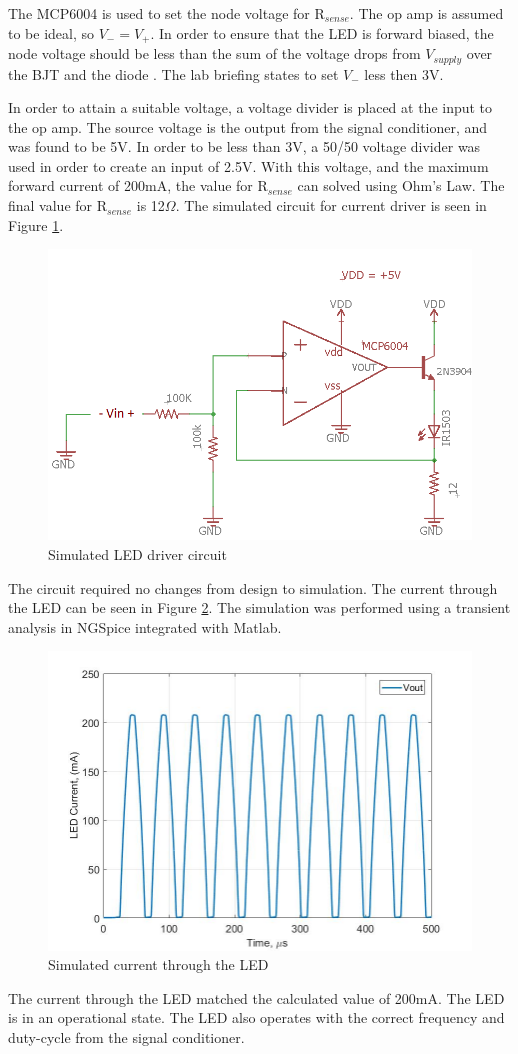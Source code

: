 The MCP6004 is used to set the node voltage for R$_{sense}$. The op amp is assumed to be ideal, so $V_- = V_+$. In order to ensure that the LED is forward biased, the node voltage should be less than the sum of the voltage drops from $V_{supply}$ over the BJT and the diode \cite{b2}. The lab briefing \cite{b2} states to set $V_-$ less then 3V.

In order to attain a suitable voltage, a voltage divider is placed at the input to the op amp. The source voltage is the output from the signal conditioner, and was found to be 5V. In order to be less than 3V, a 50/50 voltage divider was used in order to create an input of 2.5V. With this voltage, and the maximum forward current of 200mA, the value for R$_{sense}$ can solved using Ohm's Law. The final value for R$_{sense}$ is 12$\Omega$. The simulated circuit for current driver is seen in Figure \ref{fig:finalleddriverschem}.

\begin{figure}[H]
	\centering
	\includegraphics[width=0.5\linewidth]{CircuitDevelopment/FinalLEDdriverSChem}
	\caption[Simulated LED driver]{Simulated LED driver circuit}
	\label{fig:finalleddriverschem}
\end{figure}

The circuit required no changes from design to simulation. The current through the LED can be seen in Figure \ref{fig:simcurrentlab4}. The simulation was performed using a transient analysis in NGSpice integrated with Matlab.

\begin{figure}[H]
	\centering
	\includegraphics[width=0.60\linewidth]{CircuitDevelopment/sim_current_lab4}
	\caption[Simulated current]{Simulated current through the LED}
	\label{fig:simcurrentlab4}
\end{figure}

The current through the LED matched the calculated value of 200mA. The LED is in an operational state. The LED also operates with the correct frequency and duty-cycle from the signal conditioner.



